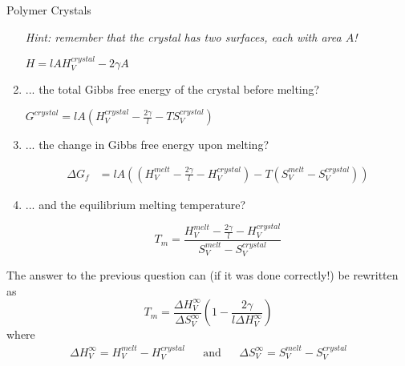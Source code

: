 \begin{activity}{Polymer Crystals}
\begin{ctqs}
\begin{enumerate}
		\emph{Hint: remember that the crystal has \emph{two} surfaces, each with area $A$!}
		
		\begin{solution}[0.5in]
			$H = lAH_V^{crystal} - 2\gamma A$
		\end{solution}
		
			\item ... the total Gibbs free energy of the crystal before melting?
			
				\begin{solution}[0.5in]
					$G^{crystal} = lA(  H^{crystal}_V - \frac{2 \gamma}{l} - T S^{crystal}_V )$
				\end{solution}
			
			\item ... the change in Gibbs free energy upon melting?
			
				\begin{solution}[1.5in]
					\begin{align*}
						\Delta G_f %
							&= lA( (H^{melt}_V - \frac{2 \gamma}{l} - H^{crystal}_V) - T(S^{melt}_V - S^{crystal}_V) )
					\end{align*}
				\end{solution}
			
			\item ... and the equilibrium melting temperature?
			
				\begin{solution}[1.25in]
					\begin{equation*}
						T_m = \frac{H^{melt}_V - \frac{2 \gamma}{l} - H^{crystal}_V}{S^{melt}_V - S^{crystal}_V }
					\end{equation*}
				\end{solution}
		
		\end{enumerate} 
		
\end{ctqs}
		
\begin{infobox}
	The answer to the previous question can (if it was done correctly!) be rewritten as
		\begin{equation*}
			T_m = \frac{\Delta H^\infty_V}{\Delta S^\infty_V}\left(1-\frac{2\gamma}{l \Delta H^\infty_V}\right)
		\end{equation*}
		where
		\begin{align*}
			\Delta H^\infty_V = H^{melt}_V - H^{crystal}_V && \text{and} && \Delta S^\infty_V = S^{melt}_V - S^{crystal}_V
		\end{align*}
		

\end{infobox}
\end{activity}
